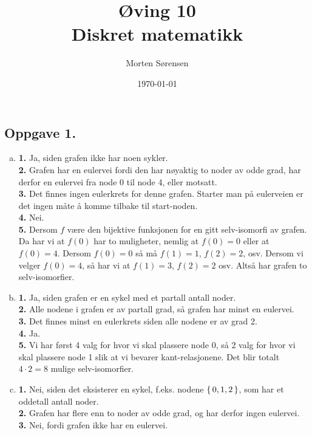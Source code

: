 \documentclass{article}
\title{\huge{Øving 10\\ Diskret matematikk}}
\author{Morten Sørensen}
\date{\today}
\begin{document}
\maketitle

\subsection*{Oppgave 1.}
\begin{enumerate}[(a)]
    \item {
        \textbf{1.} Ja, siden grafen ikke har noen sykler. \\
        \textbf{2.} Grafen har en eulervei fordi den har nøyaktig to noder av odde grad, har derfor en eulervei 
        fra node 0 til node 4, eller motsatt. \\
        \textbf{3.} Det finnes ingen eulerkrets for denne grafen. Starter man på eulerveien er det ingen måte å komme tilbake til 
        start-noden. \\
        \textbf{4.} Nei. \\
        \textbf{5.} Dersom $f$ være den bijektive funksjonen for en gitt selv-isomorfi av grafen. Da har vi at $f(0)$ har to muligheter,
        nemlig at $f(0) = 0$ eller at $f(0) = 4$. Dersom $f(0) = 0$ så må $f(1) = 1$, $f(2) = 2$, osv. Dersom 
        vi velger $f(0) = 4$, så har vi at $f(1) = 3$, $f(2) = 2$ osv. Altså har grafen to selv-isomorfier.
    }
    \item {
        \textbf{1.} Ja, siden grafen er en sykel med et partall antall noder. \\
        \textbf{2.} Alle nodene i grafen er av partall grad, så grafen har minst en eulervei. \\
        \textbf{3.} Det finnes minst en eulerkrets siden alle nodene er av grad 2. \\
        \textbf{4.} Ja. \\
        \textbf{5.} Vi har først 4 valg for hvor vi skal plassere node 0, så 2 valg for hvor vi skal plassere 
        node 1 slik at vi bevarer kant-relasjonene. Det blir totalt $4 \cdot 2 = 8$ mulige selv-isomorfier.
    }
    \item {
        \textbf{1.} Nei, siden det eksisterer en sykel, f.eks. nodene $\set{0, 1, 2}$, som har et oddetall antall noder. \\
        \textbf{2.} Grafen har flere enn to noder av odde grad, og har derfor ingen eulervei. \\
        \textbf{3.} Nei, fordi grafen ikke har en eulervei. \\
}
\end{enumerate}
\end{document}
